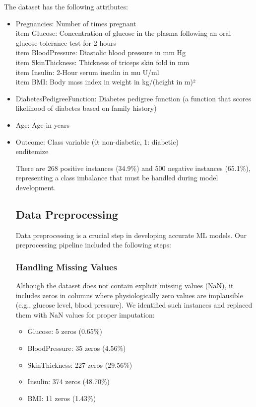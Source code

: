 \documentclass[conference]{IEEEtran}
\begin{document}
The dataset has the following attributes:
\begin{itemize}
    \item Pregnancies: Number of times pregnant
\\item Glucose: Concentration of glucose in the plasma following an oral glucose tolerance test for 2 hours
    \\item BloodPressure: Diastolic blood pressure in mm Hg
    \\item SkinThickness: Thickness of triceps skin fold in mm
    \\item Insulin: 2-Hour serum insulin in mu U/ml
    \\item BMI: Body mass index in weight in kg/(height in m)²
\item DiabetesPedigreeFunction: Diabetes pedigree function (a function that scores likelihood of diabetes based on family history)
    \item Age: Age in years
    \item Outcome: Class variable (0: non-diabetic, 1: diabetic)
\\end{itemize}

There are 268 positive instances (34.9\%) and 500 negative instances (65.1\%), representing a class imbalance that must be handled during model development.

\subsection{Data Preprocessing}
Data preprocessing is a crucial step in developing accurate ML models. Our preprocessing pipeline included the following steps:

\subsubsection{Handling Missing Values}
Although the dataset does not contain explicit missing values (NaN), it includes zeros in columns where physiologically zero values are implausible (e.g., glucose level, blood pressure). We identified such instances and replaced them with NaN values for proper imputation:

\begin{itemize}
    \item Glucose: 5 zeros (0.65\%)
    \item BloodPressure: 35 zeros (4.56\%)
    \item SkinThickness: 227 zeros (29.56\%)
    \item Insulin: 374 zeros (48.70\%)
    \item BMI: 11 zeros (1.43\%)
\end{itemize}


\end{itemize}
\end{document}
